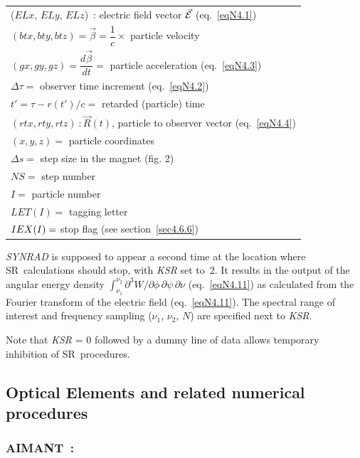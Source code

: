 \begin{tabular}{l} 
 ($ELx$, $ELy$, $ELz$)~:  electric field vector $\vec{\mathcal{E}} $ 
 						(eq.~\ref{eqN4.1}) \\
 $(btx, bty, btz) = \vec\beta= \dfrac{1}{c} \times$ particle velocity \\
$(gx, gy, gz) = \dfrac{d\vec\beta}{dt} =$ particle acceleration (eq.~\ref{eqN4.3}) \\					
$\Delta \tau =$ observer time increment (eq.~\ref{eqN4.2}) \\
$t' = \tau  - r(t')/c = $ retarded (particle) time \\
$(rtx, rty, rtz)~: \vec R(t)$, particle to observer vector (eq.~\ref{eqN4.4}) \\
$(x, y, z) =$ particle coordinates\\
$\Delta s = $ step size in the magnet (fig. 2)\\
$NS=$ step number\\
$I=$ particle number\\
$LET(I)=$ tagging letter\\
$IEX(I)\index{IEX@{\IEX}}=$ stop flag (see section~\ref{sec4.6.6}) 
\end{tabular}
\bigskip


\noindent\textsl{SYNRAD} is supposed to appear a second time at the 
location where SR~calculations should stop, with \textsl{KSR} set 
to~2. It results in the output of the angular energy density 
$\int_{\nu_1}^{\nu_2} \partial^3 W / \partial \phi \, \partial \psi 
\, \partial \nu$ (eq.~\ref{eqN4.11}) as calculated from the Fourier transform 
of the electric field (eq.~\ref{eqN4.11}). The spectral range of 
interest and frequency sampling ($\nu_1$, $\nu_2$, $N$) are specified 
next to \textsl{KSR}.
\bigskip

\noindent Note that \textsl{KSR} = 0 followed by a dummy line of 
data allows temporary inhibition of SR~procedures.

\newpage

\subsection{Optical Elements and related numerical procedures} \label{sec4.4}

\subsubsection*{AIMANT~:  \AIMANTTitl}\label{AIMANT}
\medskip

